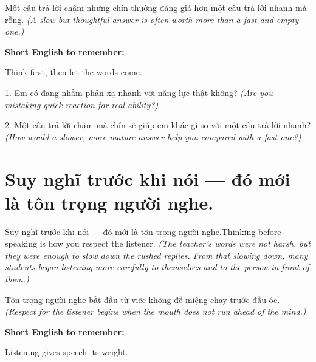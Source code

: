 \begin{baihoc}
Một câu trả lời chậm nhưng chín thường đáng giá hơn một câu trả lời nhanh mà rỗng.
\textit{(A slow but thoughtful answer is often worth more than a fast and empty one.)}
\end{baihoc}

\begin{ghinhoanh}
\textbf{Short English to remember:}

Think first, then let the words come.

\end{ghinhoanh}

\begin{tuhocnhanh}
1. Em có đang nhầm phản xạ nhanh với năng lực thật không? \textit{(Are you mistaking quick reaction for real ability?)}

2. Một câu trả lời chậm mà chín sẽ giúp em khác gì so với một câu trả lời nhanh? \textit{(How would a slower, more mature answer help you compared with a fast one?)}
\end{tuhocnhanh}
\ngancach


\section{Suy nghĩ trước khi nói — đó mới là tôn trọng người nghe.}
\begin{truyen}{Suy nghĩ trước khi nói — đó mới là tôn trọng người nghe.}{Thinking before speaking is how you respect the listener.}
\textit{(The teacher's words were not harsh, but they were enough to slow down the rushed replies. From that slowing down, many students began listening more carefully to themselves and to the person in front of them.)}
\end{truyen}

\begin{baihoc}
Tôn trọng người nghe bắt đầu từ việc không để miệng chạy trước đầu óc.
\textit{(Respect for the listener begins when the mouth does not run ahead of the mind.)}
\end{baihoc}

\begin{ghinhoanh}
\textbf{Short English to remember:}

Listening gives speech its weight.

\end{ghinhoanh}

